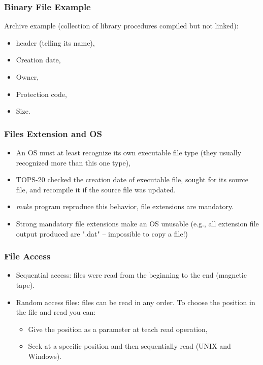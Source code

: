\begin{frame}
  \frametitle{Binary File Example}
  \begin{block}{Archive example (collection of library procedures compiled but not linked):}
    \begin{itemize}
      \item header (telling its name),
      \item Creation date,
      \item Owner,
      \item Protection code,
      \item Size.
    \end{itemize}
  \end{block}
\end{frame}

\begin{frame}
  \frametitle{Files Extension and OS}
    \begin{itemize}
      \item An OS must at least recognize its own executable file type (they usually recognized more than this one type),
      \item TOPS-20 checked the creation date of executable file, sought for its source file, and recompile it if the source file was updated.
      \item \emph{make} program reproduce this behavior, file extensions are mandatory.
      \item Strong mandatory file extensions make an OS unusable (e.g., all extension file output produced are ".dat" -- impossible to copy a file!)
    \end{itemize}
\end{frame}

\begin{frame}
  \frametitle{File Access}
    \begin{itemize}
      \item Sequential access: files were read from the beginning to the end (magnetic tape).
      \item Random access files: files can be read in any order. To choose the position in the file and read you can:
      \begin{itemize}
          \item Give the position as a parameter at teach read operation,
          \item Seek at a specific position and then sequentially read (UNIX and Windows).
      \end{itemize}
    \end{itemize}
\end{frame}

